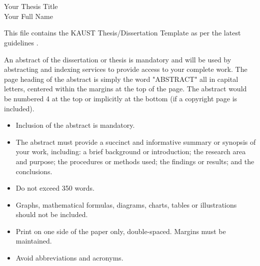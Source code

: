 

\chapter*{}

\doublespacing
{}

\begin{center}
\Large {Your Thesis Title\\
Your Full Name}
\end{center}

This file contains the KAUST Thesis/Dissertation Template as per the latest guidelines \cite{guidelines}.

An abstract of the dissertation or thesis is mandatory and will be used by abstracting and indexing services to provide access to your complete work. The page heading of the abstract is simply the word "ABSTRACT" all in capital letters, centered within the margins at the top of the page. The abstract would be numbered 4 at the top or implicitly at the bottom (if a copyright page is included).

\begin{itemize}
\item Inclusion of the abstract is mandatory.
\item	The abstract must provide a succinct and informative summary or synopsis of your work, including: a brief background or introduction; the research area and purpose; the procedures or methods used; the findings or results; and the conclusions.
\item	Do not exceed 350 words.
\item	Graphs, mathematical formulas, diagrams, charts, tables or illustrations should not be included. 
\item	Print on one side of the paper only, double-spaced.  Margins must be maintained. 
\item	Avoid abbreviations and acronyms.

\end{itemize}

